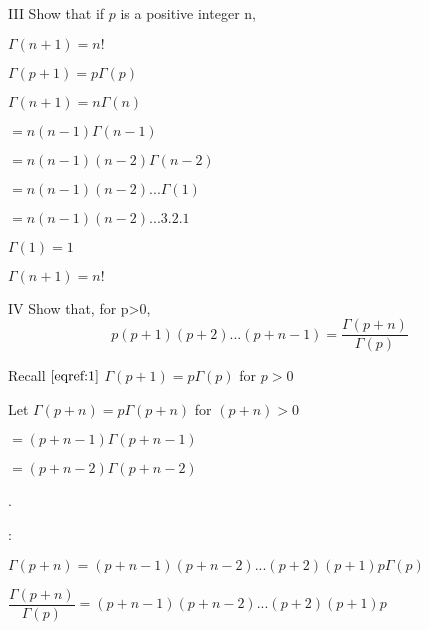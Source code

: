 \documentclass{article}
\begin{document}
III Show that if $p$ is a positive integer n,
\begin{center}
$\Gamma(n+1) = n!$

$\Gamma(p+1) = p\Gamma (p)$

$\Gamma(n+1) = n\Gamma (n)$

$ = n(n-1)\Gamma (n-1)$

$ = n(n-1)(n-2)\Gamma (n-2)$

$ = n(n-1)(n-2)...\Gamma (1)$

$ = n(n-1)(n-2)...3.2.1$
\end{center}
\begin{flushright}
$\Gamma(1) = 1$
\end{flushright}
\begin{center}
$ \Gamma (n+1)= n!$
\end{center}

IV Show that, for p>0, 
\begin{equation}
p(p+1)(p+2)...(p+n-1) = \dfrac{\Gamma (p+n)}{\Gamma (p)}
\end{equation}

\begin{flushright}
Recall $\eqref{eqref:1}$
$\Gamma(p+1) = p\Gamma(p)$ for $p>0$
\end{flushright}
\begin{center}
Let $\Gamma (p+n) = p\Gamma (p+n)$ for $(p+n)>0$

$ = (p+n-1)\Gamma (p+n-1)$

$ = (p+n-2) \Gamma (p+n-2)$

.

:

$\Gamma (p+n) = (p+n-1)(p+n-2)...(p+2)(p+1)p\Gamma (p)$

$\dfrac{\Gamma (p+n)}{\Gamma (p)} = (p+n-1)(p+n-2)...(p+2)(p+1)p$


\end{center}
\end{document}

